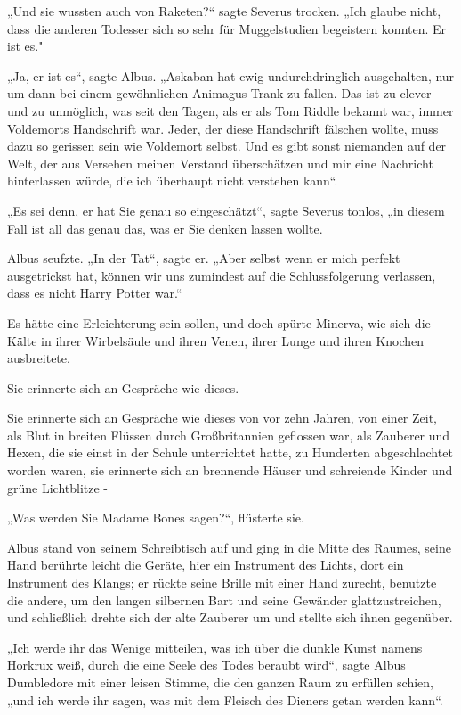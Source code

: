 {„Und sie wussten auch von Raketen?“ sagte Severus trocken. „Ich glaube nicht, dass die anderen Todesser sich so sehr für Muggelstudien begeistern konnten. Er ist es."

„Ja, er ist es“, sagte Albus. „Askaban hat ewig undurchdringlich ausgehalten, nur um dann bei einem gewöhnlichen Animagus-Trank zu fallen. Das ist zu clever und zu unmöglich, was seit den Tagen, als er als Tom Riddle bekannt war, immer Voldemorts Handschrift war. Jeder, der diese Handschrift fälschen wollte, muss dazu so gerissen sein wie Voldemort selbst. Und es gibt sonst niemanden auf der Welt, der aus Versehen meinen Verstand überschätzen und mir eine Nachricht hinterlassen würde, die ich überhaupt nicht verstehen kann“.

„Es sei denn, er hat Sie genau so eingeschätzt“, sagte Severus tonlos, „in diesem Fall ist all das genau das, was er Sie denken lassen wollte.

Albus seufzte. „In der Tat“, sagte er. „Aber selbst wenn er mich perfekt ausgetrickst hat, können wir uns zumindest auf die Schlussfolgerung verlassen, dass es nicht Harry Potter war.“

Es hätte eine Erleichterung sein sollen, und doch spürte Minerva, wie sich die Kälte in ihrer Wirbelsäule und ihren Venen, ihrer Lunge und ihren Knochen ausbreitete.

Sie erinnerte sich an Gespräche wie dieses.

Sie erinnerte sich an Gespräche wie dieses von vor zehn Jahren, von einer Zeit, als Blut in breiten Flüssen durch Großbritannien geflossen war, als Zauberer und Hexen, die sie einst in der Schule unterrichtet hatte, zu Hunderten abgeschlachtet worden waren, sie erinnerte sich an brennende Häuser und schreiende Kinder und grüne Lichtblitze -

„Was werden Sie Madame Bones sagen?“, flüsterte sie.

Albus stand von seinem Schreibtisch auf und ging in die Mitte des Raumes, seine Hand berührte leicht die Geräte, hier ein Instrument des Lichts, dort ein Instrument des Klangs; er rückte seine Brille mit einer Hand zurecht, benutzte die andere, um den langen silbernen Bart und seine Gewänder glattzustreichen, und schließlich drehte sich der alte Zauberer um und stellte sich ihnen gegenüber.

„Ich werde ihr das Wenige mitteilen, was ich über die dunkle Kunst namens Horkrux weiß, durch die eine Seele des Todes beraubt wird“, sagte Albus Dumbledore mit einer leisen Stimme, die den ganzen Raum zu erfüllen schien, „und ich werde ihr sagen, was mit dem Fleisch des Dieners getan werden kann“.

}
